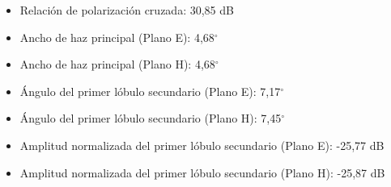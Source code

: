 \begin{itemize}
\begin{itemize}
\item Relación de polarización cruzada: 30,85 dB
\item Ancho de haz principal (Plano E): 4,68$^{\circ}$
\item Ancho de haz principal (Plano H): 4,68$^{\circ}$
\item Ángulo del primer lóbulo secundario (Plano E): 7,17$^{\circ}$
\item Ángulo del primer lóbulo secundario (Plano H): 7,45$^{\circ}$
\item Amplitud normalizada del primer lóbulo secundario (Plano E): -25,77 dB
\item Amplitud normalizada del primer lóbulo secundario (Plano H): -25,87 dB
\end{itemize}
\end{itemize}
